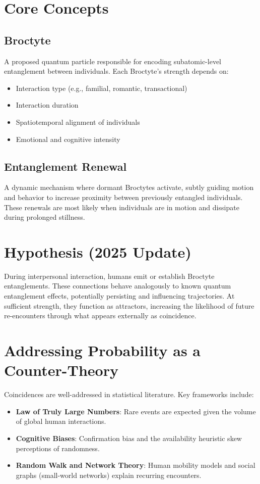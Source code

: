 \documentclass[11pt]{article}
\begin{document}
\section{Core Concepts}

\subsection{Broctyte}
A proposed quantum particle responsible for encoding subatomic-level entanglement between individuals. Each Broctyte’s strength depends on:
\begin{itemize}[nosep]
\item Interaction type (e.g., familial, romantic, transactional)
\item Interaction duration
\item Spatiotemporal alignment of individuals
\item Emotional and cognitive intensity
\end{itemize}

\subsection{Entanglement Renewal}
A dynamic mechanism where dormant Broctytes activate, subtly guiding motion and behavior to increase proximity between previously entangled individuals. These renewals are most likely when individuals are in motion and dissipate during prolonged stillness.

\section{Hypothesis (2025 Update)}

During interpersonal interaction, humans emit or establish Broctyte entanglements. These connections behave analogously to known quantum entanglement effects, potentially persisting and influencing trajectories. At sufficient strength, they function as attractors, increasing the likelihood of future re-encounters through what appears externally as coincidence.

\section{Addressing Probability as a Counter-Theory}

Coincidences are well-addressed in statistical literature. Key frameworks include:

\begin{itemize}[nosep]
\item \textbf{Law of Truly Large Numbers}: Rare events are expected given the volume of global human interactions.
\item \textbf{Cognitive Biases}: Confirmation bias and the availability heuristic skew perceptions of randomness.
\item \textbf{Random Walk and Network Theory}: Human mobility models and social graphs (small-world networks) explain recurring encounters.
\end{itemize}
\end{document}

